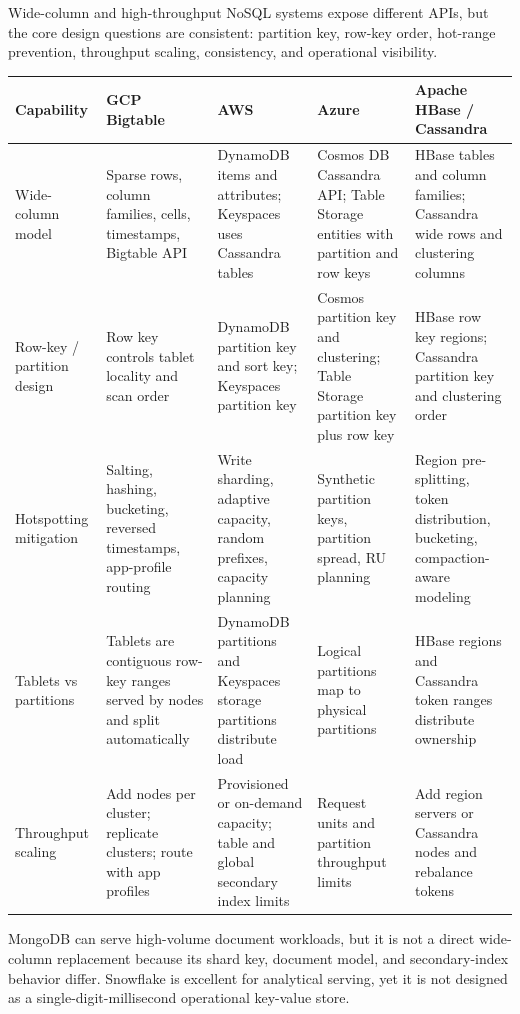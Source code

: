 \begin{crosscloud}
Wide-column and high-throughput NoSQL systems expose different APIs, but the core design questions are consistent: partition key, row-key order, hot-range prevention, throughput scaling, consistency, and operational visibility.

\vspace{2mm}
{\footnotesize
\begin{tabular}{@{}p{2.2cm}p{2.6cm}p{2.8cm}p{2.8cm}p{2.8cm}@{}}
\toprule
\textbf{Capability} & \textbf{GCP Bigtable} & \textbf{AWS} & \textbf{Azure} & \textbf{Apache HBase / Cassandra} \\
\midrule
Wide-column model & Sparse rows, column families, cells, timestamps, Bigtable API & DynamoDB items and attributes; Keyspaces uses Cassandra tables & Cosmos DB Cassandra API; Table Storage entities with partition and row keys & HBase tables and column families; Cassandra wide rows and clustering columns \\
Row-key / partition design & Row key controls tablet locality and scan order & DynamoDB partition key and sort key; Keyspaces partition key & Cosmos partition key and clustering; Table Storage partition key plus row key & HBase row key regions; Cassandra partition key and clustering order \\
Hotspotting mitigation & Salting, hashing, bucketing, reversed timestamps, app-profile routing & Write sharding, adaptive capacity, random prefixes, capacity planning & Synthetic partition keys, partition spread, RU planning & Region pre-splitting, token distribution, bucketing, compaction-aware modeling \\
Tablets vs partitions & Tablets are contiguous row-key ranges served by nodes and split automatically & DynamoDB partitions and Keyspaces storage partitions distribute load & Logical partitions map to physical partitions & HBase regions and Cassandra token ranges distribute ownership \\
Throughput scaling & Add nodes per cluster; replicate clusters; route with app profiles & Provisioned or on-demand capacity; table and global secondary index limits & Request units and partition throughput limits & Add region servers or Cassandra nodes and rebalance tokens \\
\bottomrule
\end{tabular}}

\vspace{1mm}
MongoDB can serve high-volume document workloads, but it is not a direct wide-column replacement because its shard key, document model, and secondary-index behavior differ. Snowflake is excellent for analytical serving, yet it is not designed as a single-digit-millisecond operational key-value store.
\end{crosscloud}


